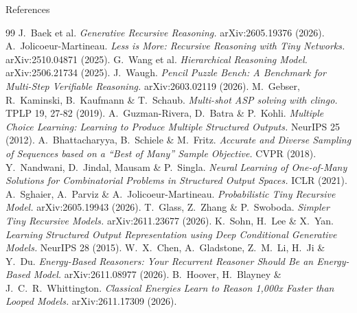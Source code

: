 \documentclass[aspectratio=169,10pt]{beamer}
\begin{document}
\begin{frame}[allowframebreaks]{References}
  \begin{thebibliography}{99}\setlength{\itemsep}{0.15em}
     J.\ Baek et al. \emph{Generative Recursive Reasoning.} arXiv:2605.19376 (2026).
     A.\ Jolicoeur-Martineau. \emph{Less is More: Recursive Reasoning with Tiny Networks.} arXiv:2510.04871 (2025).
     G.\ Wang et al. \emph{Hierarchical Reasoning Model.} arXiv:2506.21734 (2025).
     J.\ Waugh. \emph{Pencil Puzzle Bench: A Benchmark for Multi-Step Verifiable Reasoning.} arXiv:2603.02119 (2026).
     M.\ Gebser, R.\ Kaminski, B.\ Kaufmann \& T.\ Schaub. \emph{Multi-shot ASP solving with clingo.} TPLP 19, 27-82 (2019).
     A.\ Guzman-Rivera, D.\ Batra \& P.\ Kohli. \emph{Multiple Choice Learning: Learning to Produce Multiple Structured Outputs.} NeurIPS 25 (2012).
     A.\ Bhattacharyya, B.\ Schiele \& M.\ Fritz. \emph{Accurate and Diverse Sampling of Sequences based on a ``Best of Many'' Sample Objective.} CVPR (2018).
     Y.\ Nandwani, D.\ Jindal, Mausam \& P.\ Singla. \emph{Neural Learning of One-of-Many Solutions for Combinatorial Problems in Structured Output Spaces.} ICLR (2021).
     A.\ Sghaier, A.\ Parviz \& A.\ Jolicoeur-Martineau. \emph{Probabilistic Tiny Recursive Model.} arXiv:2605.19943 (2026).
     T.\ Glass, Z.\ Zhang \& P.\ Swoboda. \emph{Simpler Tiny Recursive Models.} arXiv:2611.23677 (2026).
     K.\ Sohn, H.\ Lee \& X.\ Yan. \emph{Learning Structured Output Representation using Deep Conditional Generative Models.} NeurIPS 28 (2015).
     W.\ X.\ Chen, A.\ Gladstone, Z.\ M.\ Li, H.\ Ji \& Y.\ Du. \emph{Energy-Based Reasoners: Your Recurrent Reasoner Should Be an Energy-Based Model.} arXiv:2611.08977 (2026).
     B.\ Hoover, H.\ Blayney \& J.\ C.\ R.\ Whittington. \emph{Classical Energies Learn to Reason 1,000x Faster than Looped Models.} arXiv:2611.17309 (2026).
  \end{thebibliography}
\end{frame}
\end{document}
